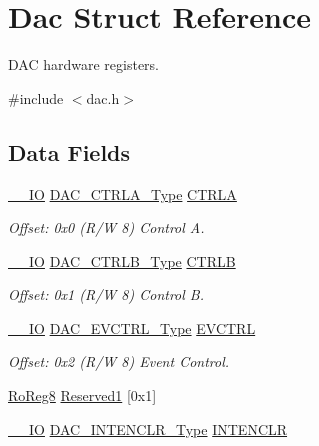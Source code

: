 \hypertarget{struct_dac}{}\section{Dac Struct Reference}
\label{struct_dac}


D\+AC hardware registers.  




{\ttfamily \#include $<$dac.\+h$>$}

\subsection*{Data Fields}
\begin{DoxyCompactItemize}
\item 
\mbox{\hyperlink{core__cm0plus_8h_aec43007d9998a0a0e01faede4133d6be}{\+\_\+\+\_\+\+IO}} \mbox{\hyperlink{union_d_a_c___c_t_r_l_a___type}{D\+A\+C\+\_\+\+C\+T\+R\+L\+A\+\_\+\+Type}} \mbox{\hyperlink{struct_dac_a63c3df9047d43c3d162f79612079a025}{C\+T\+R\+LA}}
\begin{DoxyCompactList}\small\item\em Offset\+: 0x0 (R/W 8) Control A. \end{DoxyCompactList}\item 
\mbox{\hyperlink{core__cm0plus_8h_aec43007d9998a0a0e01faede4133d6be}{\+\_\+\+\_\+\+IO}} \mbox{\hyperlink{union_d_a_c___c_t_r_l_b___type}{D\+A\+C\+\_\+\+C\+T\+R\+L\+B\+\_\+\+Type}} \mbox{\hyperlink{struct_dac_a74b22a8638d8b9b2d51e81a07e768280}{C\+T\+R\+LB}}
\begin{DoxyCompactList}\small\item\em Offset\+: 0x1 (R/W 8) Control B. \end{DoxyCompactList}\item 
\mbox{\hyperlink{core__cm0plus_8h_aec43007d9998a0a0e01faede4133d6be}{\+\_\+\+\_\+\+IO}} \mbox{\hyperlink{union_d_a_c___e_v_c_t_r_l___type}{D\+A\+C\+\_\+\+E\+V\+C\+T\+R\+L\+\_\+\+Type}} \mbox{\hyperlink{struct_dac_aa6f45347a49f38b08fe4e2b0798acefc}{E\+V\+C\+T\+RL}}
\begin{DoxyCompactList}\small\item\em Offset\+: 0x2 (R/W 8) Event Control. \end{DoxyCompactList}\item 
\mbox{\hyperlink{group___s_a_m_d21_e15_a__definitions_ga0d957f1433aaf5d70e4dc2b68288442d}{Ro\+Reg8}} \mbox{\hyperlink{struct_dac_a092866123ac46d0985136e4dca2f36f4}{Reserved1}} \mbox{[}0x1\mbox{]}
\item 
\mbox{\hyperlink{core__cm0plus_8h_aec43007d9998a0a0e01faede4133d6be}{\+\_\+\+\_\+\+IO}} \mbox{\hyperlink{union_d_a_c___i_n_t_e_n_c_l_r___type}{D\+A\+C\+\_\+\+I\+N\+T\+E\+N\+C\+L\+R\+\_\+\+Type}} \mbox{\hyperlink{struct_dac_a3b4e072f5171822143662fbe6eeb2685}{I\+N\+T\+E\+N\+C\+LR}}

\end{DoxyCompactItemize}
